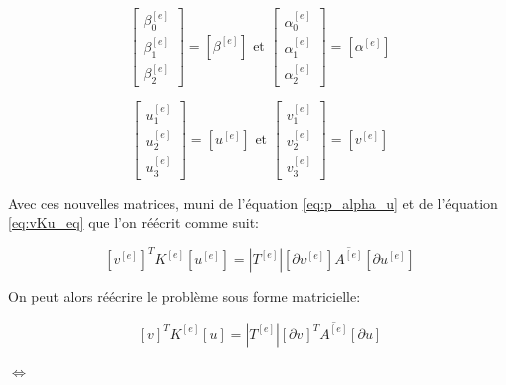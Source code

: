 \documentclass{article}
\begin{document}
\begin{equation}
    \begin{bmatrix}
        \beta_0^{[e]} \\ \beta_1^{[e]} \\ \beta_2^{[e]}
    \end{bmatrix}
    = \left[ \beta^{[e]} \right]
    \text{ et }
    \begin{bmatrix}
        \alpha_0^{[e]} \\ \alpha_1^{[e]} \\ \alpha_2^{[e]}
    \end{bmatrix}
    = \left[ \alpha^{[e]} \right]
\end{equation}

\begin{equation}
    \begin{bmatrix}
        u_1^{[e]} \\ u_2^{[e]} \\ u_3^{[e]}
    \end{bmatrix}
    = \left[ u^{[e]} \right]
    \text{ et }
    \begin{bmatrix}
        v_1^{[e]} \\ v_2^{[e]} \\ v_3^{[e]}
    \end{bmatrix}
    = \left[ v^{[e]} \right]
\end{equation}

Avec ces nouvelles matrices, muni de l'équation
\ref{eq:p_alpha_u} et de l'équation \ref{eq:vKu_eq} que l'on réécrit
comme suit:

\begin{equation}
    \left[ v^{[e]} \right]^T K^{[e]} \left[ u^{[e]} \right]
    =
    |T^{[e]}| \left[ \partial v^{[e]} \right]
    \overline{A^{[e]}} \left[ \partial u^{[e]} \right]
\end{equation}

On peut alors réécrire le problème sous forme matricielle:

\vspace{0.4cm}

\begin{equation}
    \left[ v \right]^T K^{[e]} \left[ u \right]
    =
    |T^{[e]}| \left[ \partial v \right]^T \overline{A^{[e]}}
    \left[ \partial u \right]
\end{equation}

\vspace{-0.3cm}

\begin{center} $\Leftrightarrow$ \end{center}
\end{document}
